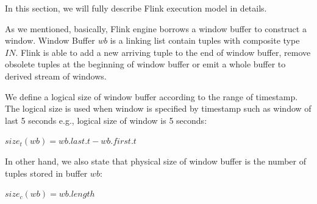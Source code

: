In this section, we will fully describe Flink execution model in details.
%
%
%
%
%

As we mentioned, basically, Flink engine borrows a window buffer to construct a window. Window Buffer \textit{wb} is a linking list contain tuples with composite type $IN$. Flink is able to add a new arriving tuple to the end of window buffer, remove obsolete tuples at the beginning of window buffer or emit a whole buffer to derived stream of windows. 

We define a logical size of window buffer according to the range of timestamp. The logical size is used when window is specified by timestamp such as window of last 5 seconds e.g., logical size of window is 5 seconds:

$size_{t}(wb) = wb.last.t - wb.first.t$

In other hand, we also state that physical size of window buffer is the number of tuples stored in buffer $wb$:

$size_c(wb) = wb.length$


